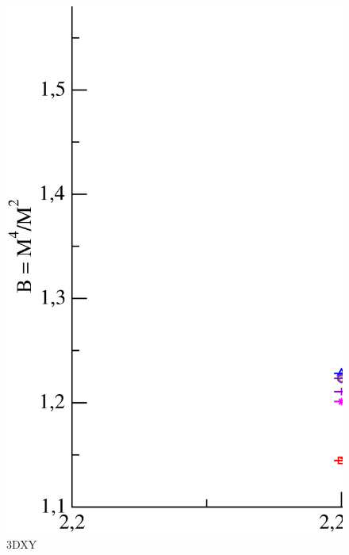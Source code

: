 \begin{figure}[!htpb]
  \centering
  \includegraphics[width=15cm]{./plots/3DXY/3DXY_BinderCumulant_vs_Temperature.eps}
  \caption{3DXY}
\end{figure}

